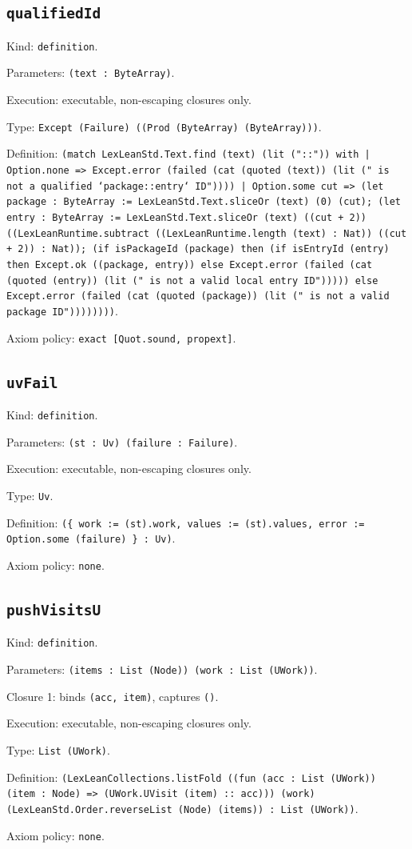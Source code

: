\documentclass[11pt]{article}
\begin{document}
\subsection*{\texttt{qualifiedId}}
\noindent Kind: \texttt{definition}.\par
\noindent Parameters: \texttt{(text : ByteArray)}.\par
\noindent Execution: executable, non-escaping closures only.\par
\noindent Type: \texttt{Except (Failure) ((Prod (ByteArray) (ByteArray)))}.\par
\noindent Definition: \texttt{(match LexLeanStd.Text.find (text) (lit ("::")) with | Option.none => Except.error (failed (cat (quoted (text)) (lit (" is not a qualified `package::entry` ID")))) | Option.some cut => (let package : ByteArray := LexLeanStd.Text.sliceOr (text) (0) (cut); (let entry : ByteArray := LexLeanStd.Text.sliceOr (text) ((cut + 2)) ((LexLeanRuntime.subtract ((LexLeanRuntime.length (text) : Nat)) ((cut + 2)) : Nat)); (if isPackageId (package) then (if isEntryId (entry) then Except.ok ((package, entry)) else Except.error (failed (cat (quoted (entry)) (lit (" is not a valid local entry ID"))))) else Except.error (failed (cat (quoted (package)) (lit (" is not a valid package ID"))))))))}.\par
\noindent Axiom policy: \texttt{exact [Quot.sound, propext]}.\par
\subsection*{\texttt{uvFail}}
\noindent Kind: \texttt{definition}.\par
\noindent Parameters: \texttt{(st : Uv) (failure : Failure)}.\par
\noindent Execution: executable, non-escaping closures only.\par
\noindent Type: \texttt{Uv}.\par
\noindent Definition: \texttt{(\{ work := (st).work, values := (st).values, error := Option.some (failure) \} : Uv)}.\par
\noindent Axiom policy: \texttt{none}.\par
\subsection*{\texttt{pushVisitsU}}
\noindent Kind: \texttt{definition}.\par
\noindent Parameters: \texttt{(items : List (Node)) (work : List (UWork))}.\par
\noindent Closure 1: binds \texttt{(acc, item)}, captures \texttt{()}.\par
\noindent Execution: executable, non-escaping closures only.\par
\noindent Type: \texttt{List (UWork)}.\par
\noindent Definition: \texttt{(LexLeanCollections.listFold ((fun (acc : List (UWork)) (item : Node) => (UWork.UVisit (item) :: acc))) (work) (LexLeanStd.Order.reverseList (Node) (items)) : List (UWork))}.\par
\noindent Axiom policy: \texttt{none}.\par
\end{document}
